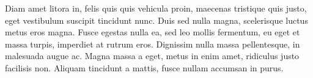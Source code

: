 Diam amet litora in, felis quis quis vehicula proin, maecenas tristique quis justo, eget vestibulum suscipit tincidunt nunc. Duis sed nulla magna, scelerisque luctus metus eros magna. Fusce egestas nulla ea, sed leo mollis fermentum, eu eget et massa turpis, imperdiet at rutrum eros. Dignissim nulla massa pellentesque, in malesuada augue ac. Magna massa a eget, metus in enim amet, ridiculus justo facilisis non. Aliquam tincidunt a mattis, fusce nullam accumsan in purus.
\endinput
